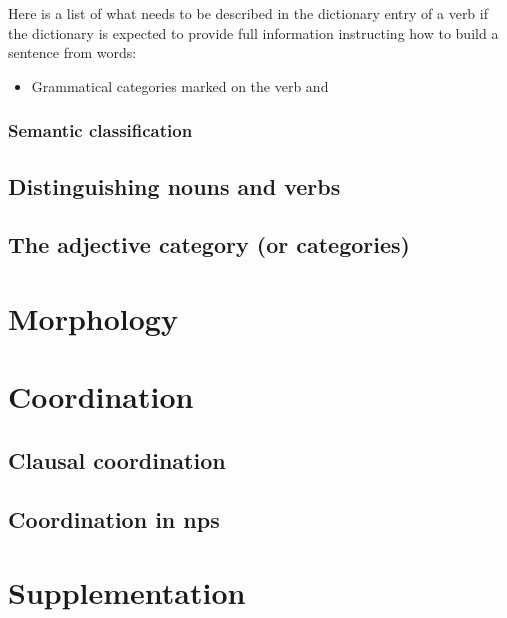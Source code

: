 \documentclass{article}
\begin{document}
Here is a list of what needs to be described in the dictionary entry of a verb
if the dictionary is expected to provide full information instructing 
how to build a sentence from words:
\begin{itemize}
    \item Grammatical categories marked on the verb and 
\end{itemize}

\subsubsection{Semantic classification}

\subsection{Distinguishing nouns and verbs}

\subsection{The adjective category (or categories)}

\section{Morphology}

\section{Coordination}

\subsection{Clausal coordination}\label{sec:clause-coord}

\subsection{Coordination in \ac{np}s}

\section{Supplementation}\label{sec:clause-supp}



\end{document}
